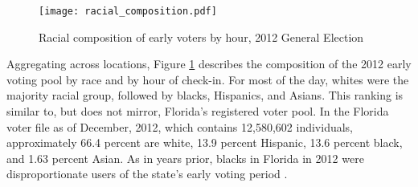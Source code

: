 \documentclass[12pt,titlepage]{article}
\begin{document}



\begin{figure}[!ht]
\caption{Racial composition of early voters by hour, 2012 General Election}
  \label{fig:race2012}
  \centering
    \centering\texttt{[image: racial\_composition.pdf]}
\end{figure}

Aggregating across locations, Figure \ref{fig:race2012} describes the
composition of the 2012 early voting pool by race and by hour of
check-in.  For most of the day, whites were the majority racial group,
followed by blacks, Hispanics, and Asians.  This ranking is similar
to, but does not mirror, Florida's registered voter pool.  In the
Florida voter file as of December, 2012, which contains 12,580,602
individuals, approximately 66.4 percent are white, 13.9 percent
Hispanic, 13.6 percent black, and 1.63 percent Asian.  As in years
prior, blacks in Florida in 2012 were disproportionate users of the
state's early voting period \citep{herronsmith:souls}.




\end{document}
